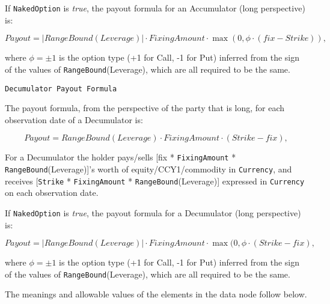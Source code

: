 If \lstinline!NakedOption! is \emph{true}, the payout formula for an Accumulator (long perspective) is:

$$
Payout = |RangeBound(Leverage)| \cdot FixingAmount \cdot \max(0, \phi \cdot (fix - Strike)),
$$

where $\phi = \pm 1$ is the option type (+1 for Call, -1 for Put) inferred from the sign of the values of \lstinline!RangeBound!(Leverage),
which are all required to be the same.

\medskip

\lstinline!Decumulator Payout Formula!

The payout formula, from the perspective of the party that is long, for each observation date of a Decumulator is:

$$
Payout = RangeBound(Leverage) \cdot FixingAmount \cdot (Strike - fix),
$$

For a Decumulator the holder pays/sells 
[fix * \lstinline!FixingAmount! * \lstinline!RangeBound!(Leverage)]'s worth of equity/CCY1/commodity in \lstinline!Currency!, and receives 
[\lstinline!Strike! * \lstinline!FixingAmount! * \lstinline!RangeBound!(Leverage)]  expressed in \lstinline!Currency!  on each  observation date.

If \lstinline!NakedOption! is \emph{true}, the payout formula for a Decumulator (long perspective) is:

$$
Payout = |RangeBound(Leverage)| \cdot FixingAmount \cdot \max(0, \phi \cdot (Strike - fix),
$$

where $\phi = \pm 1$ is the option type (+1 for Call, -1 for Put) inferred from the sign of the values of \lstinline!RangeBound!(Leverage),
which are all required to be the same.



The meanings and allowable values of the elements in the data node follow below.

